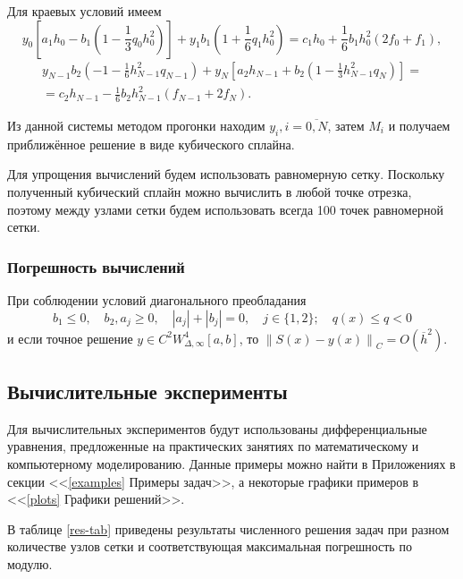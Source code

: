     Для краевых условий имеем
    \[
        y_0\left[ a_1 h_0 - b_1 \left( 1 - \frac{1}{3} q_0 h^2_0 \right) \right] + y_1 b_1 \left( 1 + \frac{1}{6} q_1 h_0^2 \right) = c_1 h_0 + \frac{1}{6} b_1 h_0^2 ( 2 f_0 + f_1 ),
    \]
    \begin{multline*}
        y_{N-1} b_2 \left( -1 - \frac{1}{6} h^2_{N-1} q_{N-1} \right) + y_N \left[ a_2 h_{N-1} + b_2 \left( 1 - \frac{1}{3} h^2_{N-1} q_N \right) \right] = \\ = c_2 h_{N-1} - \frac{1}{6} b_2 h^2_{N-1} (f_{N-1} + 2 f_N).
    \end{multline*}

    Из данной системы методом прогонки находим \( y_i, i=\overline{0,N} \), затем \( M_i \) и получаем приближённое решение в виде кубического сплайна.

    Для упрощения вычислений будем использовать равномерную сетку. Поскольку полученный кубический сплайн можно вычислить в любой точке отрезка, поэтому между узлами сетки будем использовать всегда 100 точек равномерной сетки.

    \subsubsection{Погрешность вычислений}
    При соблюдении условий диагонального преобладания
    \[
        b_1 \leq 0, \quad b_2, a_j \geq 0, \quad |a_j| + |b_j| = 0, \quad j\in\{1,2\}; \quad q(x) \leq q < 0
    \]
    и если точное решение \( y \in C^2 W^4_{\Delta, \infty} [a, b] \), то \( \left\| S(x) - y(x) \right\|_C = O\left( \overline{h}^2 \right) \).

\subsection{Вычислительные эксперименты}
Для вычислительных экспериментов будут использованы дифференциальные уравнения, предложенные на практических занятиях по математическому и компьютерному моделированию. Данные примеры можно найти в Приложениях в секции <<\ref{examples} Примеры задач>>, а некоторые графики примеров в <<\ref{plots} Графики решений>>.

В таблице \ref{res-tab} приведены результаты численного решения задач при разном количестве узлов сетки и соответствующая максимальная погрешность по модулю.

